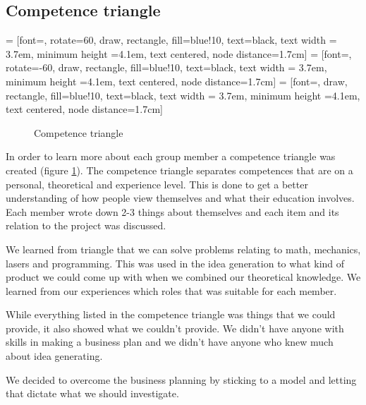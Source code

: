 \subsection{Competence triangle}
 = [font=\footnotesize, rotate=60,  draw, rectangle, fill=blue!10, text=black, text width = 3.7em, minimum height =4.1em, text centered, node distance=1.7cm]
 =  [font=\footnotesize, rotate=-60, draw, rectangle, fill=blue!10, text=black, text width = 3.7em, minimum height =4.1em, text centered, node distance=1.7cm]
 = [font=\footnotesize,             draw, rectangle, fill=blue!10, text=black, text width = 3.7em, minimum height =4.1em, text centered, node distance=1.7cm]

\begin{figure}[!ht]
\centering
{}
\caption{Competence triangle \label{fig_triangle}}
\end{figure}

In order to learn more about each group member a competence triangle was created (figure \ref{fig_triangle}). 
The competence triangle separates competences that are on a personal, theoretical and experience level. 
This is done to get a better understanding of how people view themselves and what their education involves.
Each member wrote down 2-3 things about themselves and each item and its relation to the project was discussed.

We learned from triangle that we can solve problems relating to math, mechanics, lasers and programming.
This was used in the idea generation to what kind of product we could come up with when we combined our theoretical knowledge.
We learned from our experiences which roles that was suitable for each member. 

While everything listed in the competence triangle was things that we could provide, it also showed what we couldn't provide.
We didn't have anyone with skills in making a business plan and we didn't have anyone who knew much about idea generating.

We decided to overcome the business planning by sticking to a model and letting that dictate what we should investigate.